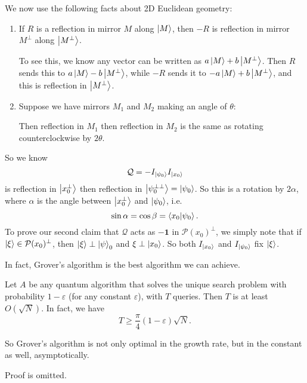 We now use the following facts about 2D Euclidean geometry:
\begin{enumerate}
  \item If $R$ is a reflection in mirror $M$ along $\left\lvert M\right\rangle$, then $-R$ is reflection in mirror $M^\perp$ along $\left\lvert M^\perp\right\rangle$.

    To see this, we know any vector can be written as $a\left\lvert M\right\rangle + b \left\lvert M^\perp\right\rangle$. Then $R$ sends this to $a \left\lvert M\right\rangle - b\left\lvert M^\perp\right\rangle$, while $-R$ sends it to $-a \left\lvert M\right\rangle + b \left\lvert M^\perp\right\rangle$, and this is reflection in $\left\lvert M^\perp\right\rangle$.

  \item Suppose we have mirrors $M_1$ and $M_2$ making an angle of $\theta$:
    \begin{center}
    \end{center}
    Then reflection in $M_1$ then reflection in $M_2$ is the same as rotating counterclockwise by $2\theta$.
\end{enumerate}
So we know
\[
  \mathcal{Q} = -I_{\left\lvert \psi_0\right\rangle} I_{\left\lvert x_0\right\rangle}
\]
is reflection in $\left\lvert x_0^\perp\right\rangle$ then reflection in $\left\lvert \psi_0^{\perp\perp}\right\rangle = \left\lvert \psi_0\right\rangle$. So this is a rotation by $2\alpha$, where $\alpha$ is the angle between $\left\lvert x_0^\perp\right\rangle$ and $\left\lvert \psi_0\right\rangle$, i.e.
\[
  \sin \alpha = \cos \beta = \left\langle x_0\middle\vert \psi_0 \right\rangle.
\]
To prove our second claim that $\mathcal{Q}$ acts as $-\mathbf{1}$ in $\mathcal{P}(x_0)^\perp$, we simply note that if $\left\lvert \xi\right\rangle \in \mathcal{P}(x_0)^\perp$, then $\left\lvert \xi\right\rangle \perp \left\lvert \psi\right\rangle_0$ and $\xi \perp\left\lvert x_0\right\rangle$. So both $I_{\left\lvert x_0\right\rangle}$ and $I_{\left\lvert \psi_0\right\rangle}$ fix $\left\lvert \xi\right\rangle$.

In fact, Grover's algorithm is the best algorithm we can achieve.
\begin{thm}
  Let $A$ be any quantum algorithm that solves the unique search problem with probability $1 - \varepsilon$ (for any constant $\varepsilon$), with $T$ queries. Then $T$ is at least $O(\sqrt{N})$. In fact, we have
  \[
    T \geq \frac{\pi}{4}(1 - \varepsilon) \sqrt{N}.
  \]
\end{thm}
So Grover's algorithm is not only optimal in the growth rate, but in the constant as well, asymptotically.

Proof is omitted.

